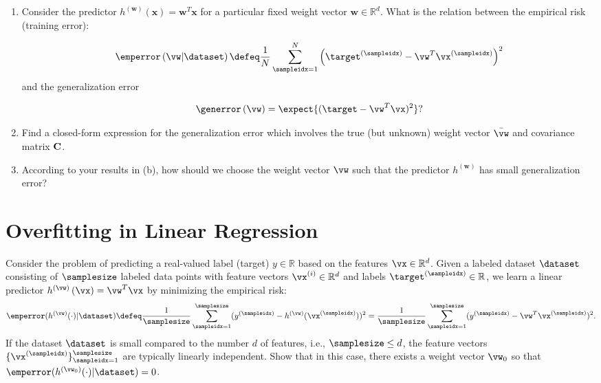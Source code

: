 \documentclass[article,11pt]{article}
\newcommand{\mC}[0]{{\bf C}}
\begin{document}
\begin{enumerate}
\item Consider the predictor $h^{(\mathbf{w})}(\mathbf{x})= \mathbf{w}^{T} \mathbf{x}$ for a particular fixed weight vector $\mathbf{w}\in \mathbb{R}^{d}$. 
What is the relation between the empirical risk (training error):

\begin{equation}
\emperror \left( \vw | \dataset\right)   \defeq \frac{1}{N} \sum_{\sampleidx=1}^{N} \left( \target^{(\sampleidx)} -  \vw^{T} \vx^{(\sampleidx)}\right) ^2 \nonumber
\vspace*{-1mm}
\end{equation}
and the generalization error

\begin{equation}
\generror \left( \vw \right)= \expect \{ (\target - \vw^{T} \vx)^2\}? \nonumber
\end{equation}

\item Find a closed-form expression for the generalization error which involves the true 
(but unknown) weight vector $\bar{\vw}$ and covariance matrix $\mC$.

\item According to your results in (b), how should we choose the weight vector $\vw$ 
such that the predictor $h^{(\mathbf{w})}$ has small generalization error?

\end{enumerate}


\newpage

\section{Overfitting in Linear Regression}
Consider the problem of predicting a real-valued label (target) $y \in \mathbb{R}$ based on the features $\vx \in \mathbb{R}^{d}$. 
Given a labeled dataset $\dataset$ consisting of $\samplesize$ labeled data points with feature vectors $\vx^{(i)} \in \mathbb{R}^d$ and labels 
$\target^{(\sampleidx)}\in \mathbb{R}$, we learn a linear predictor $h^{(\vw)}\left( \vx\right) = \vw^{T} \vx$ by minimizing the 
empirical risk: 
\[
\emperror(h^{(\vw)}(\cdot) | \dataset) \defeq  \frac{1}{\samplesize}\sum^{\samplesize}_{\sampleidx=1}(y^{(\sampleidx)} - h^{(\vw)}(\vx^{(\sampleidx)}))^2
= \frac{1}{\samplesize}\sum^{\samplesize}_{\sampleidx=1}(y^{(\sampleidx)} - \vw^{T} \vx^{(\sampleidx)})^2.
\]
\noindent
If the dataset $\dataset$ is small compared to the number $d$ of features, i.e., $\samplesize \leq d$, 
the feature vectors $\{ \vx^{(\sampleidx)} \}_{\sampleidx=1}^{\samplesize}$ are typically linearly independent. 
Show that in this case, there exists a weight vector $\vw_0$ so that $\emperror(h^{(\vw_0)}(\cdot) | \dataset)=0$.
\end{document}
